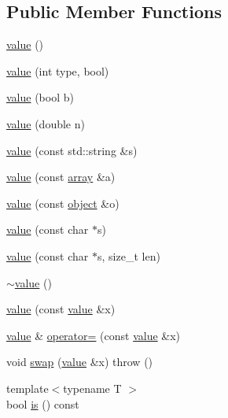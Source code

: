 \subsection*{Public Member Functions}
\begin{DoxyCompactItemize}
\item 
\hyperlink{classpicojson_1_1value_a445f8d1b335e7bcad6abd6c310b44c75}{value} ()
\item 
\hyperlink{classpicojson_1_1value_acd1d55ac7333a3e482e469b3d99fdf6e}{value} (int type, bool)
\item 
\hyperlink{classpicojson_1_1value_a43d8a33c3dbea0c5853bef4577a0d10e}{value} (bool b)
\item 
\hyperlink{classpicojson_1_1value_af19f6d5889d90e77e76af05aacaba321}{value} (double n)
\item 
\hyperlink{classpicojson_1_1value_aa4841f2dd8deeaffca7a225075b88da9}{value} (const std\+::string \&s)
\item 
\hyperlink{classpicojson_1_1value_a729e8f01d9bb4686daac82d0d3295afe}{value} (const \hyperlink{classpicojson_1_1value_adeff4fdf7ee5675eeb7686bb89233c43}{array} \&a)
\item 
\hyperlink{classpicojson_1_1value_a2b6beb88edf85e213893b805b354c87e}{value} (const \hyperlink{classpicojson_1_1value_a7d7da11d54d7b983a902d28367bda9c1}{object} \&o)
\item 
\hyperlink{classpicojson_1_1value_a94f324d88fd16c1338fc9a228ec3dc3c}{value} (const char $\ast$s)
\item 
\hyperlink{classpicojson_1_1value_ae56da06e2b438f4425300a218150398d}{value} (const char $\ast$s, size\+\_\+t len)
\item 
\hyperlink{classpicojson_1_1value_aa75329d73af82b8a7daab1905f8609d0}{$\sim$value} ()
\item 
\hyperlink{classpicojson_1_1value_a89a827eee72398d3678509cdd65c777d}{value} (const \hyperlink{classpicojson_1_1value}{value} \&x)
\item 
\hyperlink{classpicojson_1_1value}{value} \& \hyperlink{classpicojson_1_1value_acc5e4506e6a793af5132983573f9da6a}{operator=} (const \hyperlink{classpicojson_1_1value}{value} \&x)
\item 
void \hyperlink{classpicojson_1_1value_a6e3ac589ed811603ef9dadc6f91c737d}{swap} (\hyperlink{classpicojson_1_1value}{value} \&x)  throw ()
\item 
{\footnotesize template$<$typename T $>$ }\\bool \hyperlink{classpicojson_1_1value_afd038ffc8a714c5d2f4b59adaaaca4ce}{is} () const

\end{DoxyCompactItemize}

